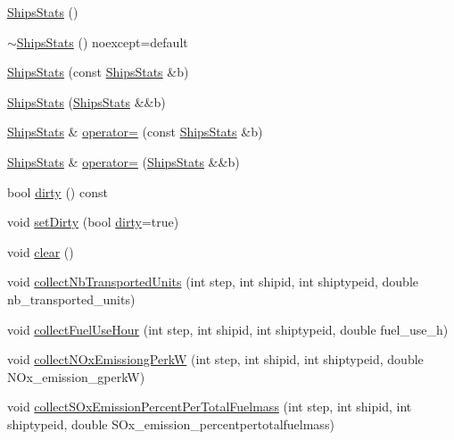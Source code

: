 \begin{DoxyCompactItemize}
\item 
\mbox{\hyperlink{class_ships_stats_ad0b17a13b5e5972b02292e96f71a2e76}{Ships\+Stats}} ()
\item 
\mbox{\hyperlink{class_ships_stats_ac926bc74d919f07554946d07c670bdf1}{$\sim$\+Ships\+Stats}} () noexcept=default
\item 
\mbox{\hyperlink{class_ships_stats_aa34115cc347bd6831c7e50dfae65d9af}{Ships\+Stats}} (const \mbox{\hyperlink{class_ships_stats}{Ships\+Stats}} \&b)
\item 
\mbox{\hyperlink{class_ships_stats_a32ca1a341209b12909febdad01a42589}{Ships\+Stats}} (\mbox{\hyperlink{class_ships_stats}{Ships\+Stats}} \&\&b)
\item 
\mbox{\hyperlink{class_ships_stats}{Ships\+Stats}} \& \mbox{\hyperlink{class_ships_stats_ae9008ec696773d7a1eccda01dd0e06fd}{operator=}} (const \mbox{\hyperlink{class_ships_stats}{Ships\+Stats}} \&b)
\item 
\mbox{\hyperlink{class_ships_stats}{Ships\+Stats}} \& \mbox{\hyperlink{class_ships_stats_a2eb52343894ba2ebb44b9951d8af3b7d}{operator=}} (\mbox{\hyperlink{class_ships_stats}{Ships\+Stats}} \&\&b)
\item 
bool \mbox{\hyperlink{class_ships_stats_a68bf3348c0f715780144d9799b33d464}{dirty}} () const
\item 
void \mbox{\hyperlink{class_ships_stats_a597a82c3a874eea69867bb94e9988b40}{set\+Dirty}} (bool \mbox{\hyperlink{class_ships_stats_a68bf3348c0f715780144d9799b33d464}{dirty}}=true)
\item 
void \mbox{\hyperlink{class_ships_stats_a7a9b1f34b774297af6384ce11b999a0f}{clear}} ()
\item 
void \mbox{\hyperlink{class_ships_stats_adf062575c6ae3be07e3ba73f9e09b74a}{collect\+Nb\+Transported\+Units}} (int step, int shipid, int shiptypeid, double nb\+\_\+transported\+\_\+units)
\item 
void \mbox{\hyperlink{class_ships_stats_a07fc97c3b7b4686e8cebd18c546f589f}{collect\+Fuel\+Use\+Hour}} (int step, int shipid, int shiptypeid, double fuel\+\_\+use\+\_\+h)
\item 
void \mbox{\hyperlink{class_ships_stats_a4d1aa1437ee63767ccb7d9a0b51d2ae9}{collect\+N\+Ox\+Emissiong\+PerkW}} (int step, int shipid, int shiptypeid, double N\+Ox\+\_\+emission\+\_\+gperkW)
\item 
void \mbox{\hyperlink{class_ships_stats_a304f65fd6dcc56d14d324ec24677dca6}{collect\+S\+Ox\+Emission\+Percent\+Per\+Total\+Fuelmass}} (int step, int shipid, int shiptypeid, double S\+Ox\+\_\+emission\+\_\+percentpertotalfuelmass)

\end{DoxyCompactItemize}
